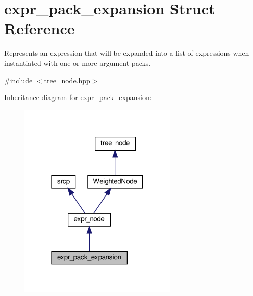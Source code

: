 \hypertarget{structexpr__pack__expansion}{}\section{expr\+\_\+pack\+\_\+expansion Struct Reference}
\label{structexpr__pack__expansion}


Represents an expression that will be expanded into a list of expressions when instantiated with one or more argument packs.  




{\ttfamily \#include $<$tree\+\_\+node.\+hpp$>$}



Inheritance diagram for expr\+\_\+pack\+\_\+expansion\+:
\nopagebreak
\begin{figure}[H]
\begin{center}
\leavevmode
\includegraphics[width=214pt]{d5/d3e/structexpr__pack__expansion__inherit__graph}
\end{center}
\end{figure}


